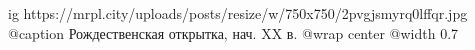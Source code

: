  
 
 
 
 

\ifcmt
  ig https://mrpl.city/uploads/posts/resize/w/750x750/2pvgjsmyrq0lffqr.jpg
	@caption Рождественская открытка, нач. XX в.
  @wrap center
  @width 0.7
\fi
